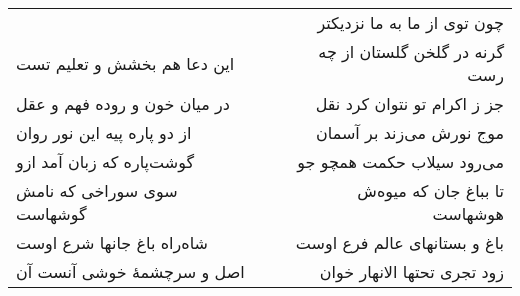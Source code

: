 \begin{center}
\begin{longtable}{l p{0.5cm} r}
&&
چون توی از ما به ما نزدیکتر
\\
این دعا هم بخشش و تعلیم تست
&&
گرنه در گلخن گلستان از چه رست
\\
در میان خون و روده فهم و عقل
&&
جز ز اکرام تو نتوان کرد نقل
\\
از دو پاره پیه این نور روان
&&
موج نورش می‌زند بر آسمان
\\
گوشت‌پاره که زبان آمد ازو
&&
می‌رود سیلاب حکمت همچو جو
\\
سوی سوراخی که نامش گوشهاست
&&
تا بباغ جان که میوه‌ش هوشهاست
\\
شاه‌راه باغ جانها شرع اوست
&&
باغ و بستانهای عالم فرع اوست
\\
اصل و سرچشمهٔ خوشی آنست آن
&&
زود تجری تحتها الانهار خوان
\\
\end{longtable}
\end{center}
